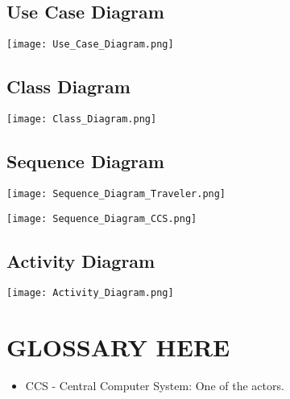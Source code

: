\documentclass[10pt]{report}
\numberwithin{equation}{section} %
\numberwithin{figure}{section} %
\numberwithin{table}{section} %
\begin{document}
\subsection{Use Case Diagram}
\begin{center}
\texttt{[image: Use\_Case\_Diagram.png]}
\end{center}

\subsection{Class Diagram}
\begin{center}
\texttt{[image: Class\_Diagram.png]}
\end{center}

\subsection{Sequence Diagram}
\begin{center}
\texttt{[image: Sequence\_Diagram\_Traveler.png]}
\end{center}

\begin{center}
\texttt{[image: Sequence\_Diagram\_CCS.png]}
\end{center}

\subsection{Activity Diagram}
\begin{center}
\texttt{[image: Activity\_Diagram.png]}
\end{center}

\section{GLOSSARY HERE}
\begin{itemize}
\item CCS - Central Computer System: One of the actors.
\end{itemize}
\end{document}
